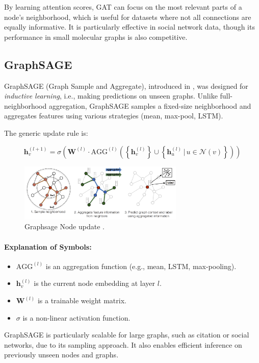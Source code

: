 \documentclass[11pt,a4paper]{article}
\begin{document}
	By learning attention scores, GAT can focus on the most relevant parts of a node's neighborhood, which is useful for datasets where not all connections are equally informative. It is particularly effective in social network data, though its performance in small molecular graphs is also competitive.
	
	\subsection{GraphSAGE}
	
	GraphSAGE (Graph Sample and Aggregate), introduced in \cite{hamilton2017inductive}, was designed for \emph{inductive learning}, i.e., making predictions on unseen graphs. Unlike full-neighborhood aggregation, GraphSAGE samples a fixed-size neighborhood and aggregates features using various strategies (mean, max-pool, LSTM).
	
	The generic update rule is:
	
	\begin{equation}
		\mathbf{h}_v^{(l+1)} = \sigma\left( \mathbf{W}^{(l)} \cdot \text{AGG}^{(l)} \left( \left\{ \mathbf{h}_v^{(l)} \right\} \cup \left\{ \mathbf{h}_u^{(l)} \, | \, u \in \mathcal{N}(v) \right\} \right) \right)
	\end{equation}

	\begin{figure}[h]
		\centering
		\includegraphics[width=0.7\textwidth]{graphsage.png}
		\caption{Graphsage Node update \cite{pic:graphsage}.}
	\end{figure}
	
	\paragraph{Explanation of Symbols:}
	\begin{itemize}
		\item $\text{AGG}^{(l)}$ is an aggregation function (e.g., mean, LSTM, max-pooling).
		\item $\mathbf{h}_v^{(l)}$ is the current node embedding at layer $l$.
		\item $\mathbf{W}^{(l)}$ is a trainable weight matrix.
		\item $\sigma$ is a non-linear activation function.
	\end{itemize}
	
	GraphSAGE is particularly scalable for large graphs, such as citation or social networks, due to its sampling approach. It also enables efficient inference on previously unseen nodes and graphs.
	
	
	
	
	
	
	
\end{document}
